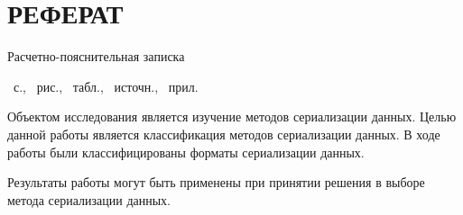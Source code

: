 \chapter*{РЕФЕРАТ}
Расчетно-пояснительная записка \begin{NoHyper}\pageref{LastPage}\end{NoHyper}~с., \totfig~рис., \tottab~табл., \thetotbibentries~источн., ~прил.
	
Объектом исследования является изучение методов сериализации данных. Целью данной работы является классификация методов сериализации данных. В ходе работы были классифицированы форматы сериализации данных. 


Результаты работы могут быть применены при принятии решения в выборе метода сериализации данных.
